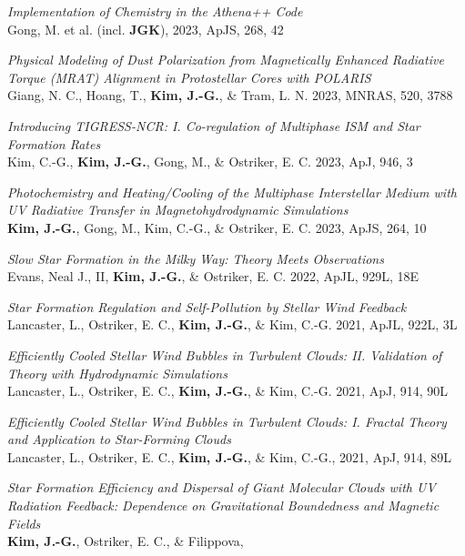 \begin{benumerate}{20}
\item \textit{Implementation of Chemistry in the Athena++ Code} \\ Gong, M. et al. (incl.
\textbf{JGK}), 2023, ApJS, 268, 42
\item \textit{Physical Modeling of Dust Polarization from Magnetically Enhanced Radiative
    Torque (MRAT) Alignment in Protostellar Cores with POLARIS} \\ Giang, N. C., Hoang,
  T., \textbf{Kim, J.-G.}, \& Tram, L. N. 2023, MNRAS, 520, 3788
\item \textit{Introducing TIGRESS-NCR: I. Co-regulation of Multiphase ISM and
Star Formation Rates} \\ Kim, C.-G., \textbf{Kim, J.-G.}, Gong, M., \& Ostriker,
E. C. 2023, ApJ, 946, 3
\item \textit{Photochemistry and Heating/Cooling of the Multiphase Interstellar
Medium with UV Radiative Transfer in Magnetohydrodynamic Simulations} \\
\textbf{Kim, J.-G.}, Gong, M., Kim, C.-G., \& Ostriker, E. C. 2023, ApJS, 264, 10
\item \textit{Slow Star Formation in the Milky Way: Theory Meets Observations}\\
  Evans, Neal J., II, \textbf{Kim, J.-G.}, \& Ostriker, E. C. 2022, ApJL, 929L,
  18E
\item \textit{Star Formation Regulation and Self-Pollution by Stellar Wind
    Feedback}\\
  Lancaster, L., Ostriker, E. C., \textbf{Kim, J.-G.}, \& Kim, C.-G. 2021, ApJL,
  922L, 3L
\item \textit{Efficiently Cooled Stellar Wind Bubbles in Turbulent Clouds:
    II. Validation of Theory with Hydrodynamic Simulations}\\
  Lancaster, L., Ostriker, E. C., \textbf{Kim, J.-G.}, \& Kim, C.-G. 2021, ApJ,
  914, 90L
\item \textit{Efficiently Cooled Stellar Wind Bubbles in Turbulent Clouds:
I. Fractal Theory and Application to Star-Forming Clouds}\\
  Lancaster, L., Ostriker, E. C., \textbf{Kim, J.-G.}, \& Kim, C.-G., 2021, ApJ,
914, 89L
\item \textit{Star Formation Efficiency and Dispersal of Giant Molecular
    Clouds with UV Radiation Feedback: Dependence on Gravitational Boundedness
    and Magnetic Fields} \\ \textbf{Kim, J.-G.}, Ostriker, E. C., \& Filippova,

\end{benumerate}
